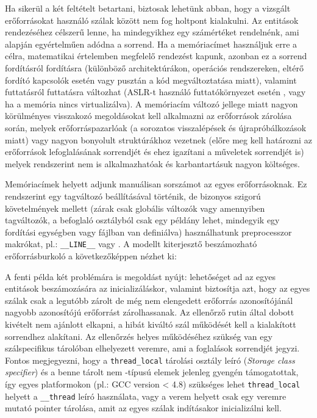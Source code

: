     Ha sikerül a két feltételt betartani, biztosak lehetünk abban, hogy a vizsgált erőforrásokat használó szálak között nem fog holtpont kialakulni. Az entitások rendezéséhez célszerű lenne, ha mindegyikhez egy számértéket rendelnénk, ami alapján egyértelműen adódna a sorrend. Ha a memóriacímet használjuk erre a célra, matematikai értelemben megfelelő rendezést kapunk, azonban ez a sorrend fordításról fordításra (különböző architektúrákon, operációs rendszereken, eltérő fordító kapcsolók esetén vagy pusztán a kód megváltoztatása miatt), valamint futtatásról futtatásra változhat (ASLR-t használó futtatókörnyezet esetén \cite{WikiASLR}, vagy ha a memória nincs virtualizálva). A memóriacím változó jellege miatt nagyon körülményes visszakozó megoldásokat kell alkalmazni az erőforrások zárolása során, melyek erőforráspazarlóak (a sorozatos visszalépések és újrapróbálkozások miatt) vagy nagyon bonyolult struktúrákhoz vezetnek (előre meg kell határozni az erőforrások lefoglalásának sorrendjét és ehez igazítani a műveletek sorrendjét is) melyek rendszerint nem is alkalmazhatóak és karbantartásuk nagyon költséges.
    
    Memóriacímek helyett adjunk manuálisan sorszámot az egyes erőforrásoknak. Ez rendszerint egy tagváltozó beállításával történik, de bizonyos szigorú követelmények mellett (zárak csak globális változók vagy amennyiben tagváltozók, a befoglaló osztályból csak egy példány lehet, mindegyik egy fordítási egységben vagy fájlban van definiálva) használhatunk preprocesszor makrókat, pl.: \texttt{\_\_LINE\_\_} vagy \cite{BOOST-PP-COUNTER()}. A \cite{C++11/Lockable} modellt kiterjesztő beszámozható erőforrásburkoló a következőképpen nézhet ki:
    
    
    A fenti példa két problémára is megoldást nyújt: lehetőséget ad az egyes entitások beszámozására az inicializáláskor, valamint biztosítja azt, hogy az egyes szálak csak a legutóbb zárolt de még nem elengedett erőforrás azonosítójánál nagyobb azonosítójú erőforrást zárolhassanak. Az ellenőrző rutin által dobott kivételt nem ajánlott elkapni, a hibát kiváltó szál működését kell a kialakított sorrendhez alakítani. Az ellenőrzés helyes működéséhez szükség van egy szálspecifikus tárolóban elhelyezett veremre, ami a foglalások sorrendjét jegyzi. Fontos megjegyezni, hogy a \texttt{thread\_local} tárolási osztály leíró (\emph{Storage class specifier}) és a benne tárolt nem \cite{C++11/POD}-típusú elemek jelenleg gyengén támogatottak, így egyes platformokon (pl.: GCC version < 4.8) szükséges lehet \texttt{thread\_local} helyett a \texttt{\_\_thread} leíró használata, vagy a verem helyett csak egy veremre mutató pointer tárolása, amit az egyes szálak indításakor inicializálni kell.
    
